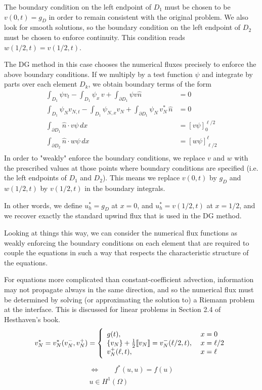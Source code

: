 The boundary condition on the left endpoint of $D_1$ must be chosen to be $v(0,t) = g_D$ in order to remain consistent with the original problem. We also look for smooth solutions, so the boundary condition on the left endpoint of $D_2$ must be chosen to enforce continuity. This condition reads $w(1/2,t) = v(1/2,t)$.

The DG method in this case chooses the numerical fluxes precisely to enforce the above boundary conditions. If we multiply by a test function $\psi$ and integrate by parts over each element $D_k$, we obtain boundary terms of the form
\begin{align*}
  \int_{D_1} \psi v_t - \int_{D_1} \psi_x \, v + \int_{\partial D_1} \psi  v \hat{n}  &= 0\\
  \int_{D_1} \psi_N v_{N,t} - \int_{D_1} \psi_{N,x}  v_N + \int_{\partial D_1} \psi_N  \,v_N^* \, \hat{n}  &= 0 \\
\int_{\partial D_1} \hat{n} \cdot v \psi \, dx &= \left[ v\psi \right]_0^{\ell/2}\\
\int_{\partial D_2} \hat{n} \cdot w \psi \, dx &= \left[ w\psi\right]_{\ell/2}^\ell \\
\end{align*}
In order to "weakly" enforce the boundary conditions, we replace $v$ and $w$ with the prescribed values at those points where boundary conditions are specified (i.e. the left endpoints of $D_1$ and $D_2$). This means we replace $v(0,t)$ by $g_D$ and $w(1/2,t)$ by $v(1/2,t)$ in the boundary integrals.

In other words, we define $u_h^* = g_D$ at $x = 0$, and $u_h^* = v(1/2,t)$ at $x=1/2$, and we recover exactly the standard upwind flux that is used in the DG method.

Looking at things this way, we can consider the numerical flux functions as weakly enforcing the boundary conditions on each element that are required to couple the equations in such a way that respects the characteristic structure of the equations.

For equations more complicated than constant-coefficient advection, information may not propagate always in the same direction, and so the numerical flux must be determined by solving (or approximating the solution to) a Riemann problem at the interface. This is discussed for linear problems in Section 2.4 of Hesthaven's book.
\begin{align*}
  v_N^* = v_N^* (v_N^-, v_N^+) = \left\{  \begin{array}{l l} g(t), \; &x = 0 \\ \{ v_N \} + \frac{1}{2}\llbracket v_N \rrbracket = v_N^-(\ell/2, t) ,\; &x=\ell/2 \\ v_N^+(\ell,t),\; &x=\ell\end{array}  \right.
\end{align*}
\begin{align*}
  \Leftrightarrow \qquad f^*(u,u) = f(u)\\
  u \in H^1(\Omega)
\end{align*}

